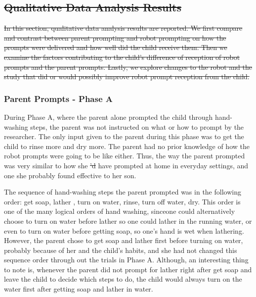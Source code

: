 \documentclass{ut-thesis}
\providecommand{\DIFaddtex}[1]{{\protect\color{blue}\uwave{#1}}} %
\providecommand{\DIFdeltex}[1]{{\protect\color{red}\sout{#1}}}                      %
\providecommand{\DIFaddbegin}{} %
\providecommand{\DIFaddend}{} %
\providecommand{\DIFdelbegin}{} %
\providecommand{\DIFdelend}{} %
\providecommand{\DIFadd}[1]{\texorpdfstring{\DIFaddtex{#1}}{#1}} %
\providecommand{\DIFdel}[1]{\texorpdfstring{\DIFdeltex{#1}}{}} %
\begin{document}
\DIFdelbegin \subsection{\DIFdel{Qualitative Data Analysis Results}}
\addtocounter{subsection}{-1}%
\DIFdel{In this section, qualitative data analysis results are reported.  We first compare and contrast between parent prompting and robot prompting on how the prompts were delivered and how well did the child receive them.  Then we examine the factors contributing to the child's difference of reception of robot prompts and the parent prompts.  Lastly, we explore changes to the robot and the study that did or would possibly improve robot prompt reception from the child.
}%

\DIFdelend \subsubsection{Parent Prompts - Phase A}
During Phase A, where the parent alone prompted the child through hand-washing steps, the parent was not instructed on what or how to prompt by the researcher.  The only input given to the parent during this phase was to get the child to rinse more and dry more.  The parent had no prior knowledge of how the robot prompts were going to be like either.  Thus, the way the parent prompted was very similar to how she \DIFdelbegin \DIFdel{'d }\DIFdelend \DIFaddbegin \DIFadd{would }\DIFaddend have prompted at home in everyday settings, and one she probably found effective to her son.

The sequence of hand-washing steps the parent prompted was in the following order: get soap, lather \DIFaddbegin \DIFadd{(synonym to scrub)}\DIFaddend , turn on water, rinse, turn off water, dry.  This order is one of the many logical orders of hand washing, since\DIFaddbegin \DIFadd{, for example, }\DIFaddend one could alternatively choose to turn on water before lather so one could lather in the running water, or even to turn on water before getting soap, so one's hand is wet when lathering.  However, the parent chose to get soap and lather first before turning on water, probably because of her and the child's habits, and she had not changed this sequence order through out the trials in Phase A.  Although, an interesting thing to note is, whenever the parent did not prompt for lather right after get soap and leave the child to decide which steps to do, the child would always turn on the water first after getting soap and lather in water.
\end{document}
